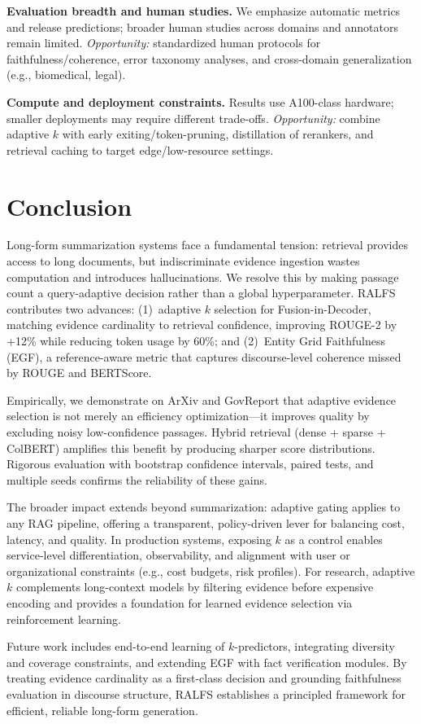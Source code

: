 \documentclass[11pt,a4paper]{article}
\begin{document}
\textbf{Evaluation breadth and human studies.} We emphasize automatic metrics and release predictions; broader human studies across domains and annotators remain limited. \emph{Opportunity:} standardized human protocols for faithfulness/coherence, error taxonomy analyses, and cross-domain generalization (e.g., biomedical, legal).

\textbf{Compute and deployment constraints.} Results use A100-class hardware; smaller deployments may require different trade-offs. \emph{Opportunity:} combine adaptive $k$ with early exiting/token-pruning, distillation of rerankers, and retrieval caching to target edge/low-resource settings.

\section{Conclusion}
\label{sec:conclusion}

Long-form summarization systems face a fundamental tension: retrieval provides access to long documents, but indiscriminate evidence ingestion wastes computation and introduces hallucinations. We resolve this by making passage count a query-adaptive decision rather than a global hyperparameter. RALFS contributes two advances: (1)~adaptive $k$ selection for Fusion-in-Decoder, matching evidence cardinality to retrieval confidence, improving ROUGE-2 by +12\% while reducing token usage by 60\%; and (2)~Entity Grid Faithfulness (EGF), a reference-aware metric that captures discourse-level coherence missed by ROUGE and BERTScore.

Empirically, we demonstrate on ArXiv and GovReport that adaptive evidence selection is not merely an efficiency optimization---it improves quality by excluding noisy low-confidence passages. Hybrid retrieval (dense + sparse + ColBERT) amplifies this benefit by producing sharper score distributions. Rigorous evaluation with bootstrap confidence intervals, paired tests, and multiple seeds confirms the reliability of these gains.

The broader impact extends beyond summarization: adaptive gating applies to any RAG pipeline, offering a transparent, policy-driven lever for balancing cost, latency, and quality. In production systems, exposing $k$ as a control enables service-level differentiation, observability, and alignment with user or organizational constraints (e.g., cost budgets, risk profiles). For research, adaptive $k$ complements long-context models by filtering evidence before expensive encoding and provides a foundation for learned evidence selection via reinforcement learning.

Future work includes end-to-end learning of $k$-predictors, integrating diversity and coverage constraints, and extending EGF with fact verification modules. By treating evidence cardinality as a first-class decision and grounding faithfulness evaluation in discourse structure, RALFS establishes a principled framework for efficient, reliable long-form generation.



\end{document}
